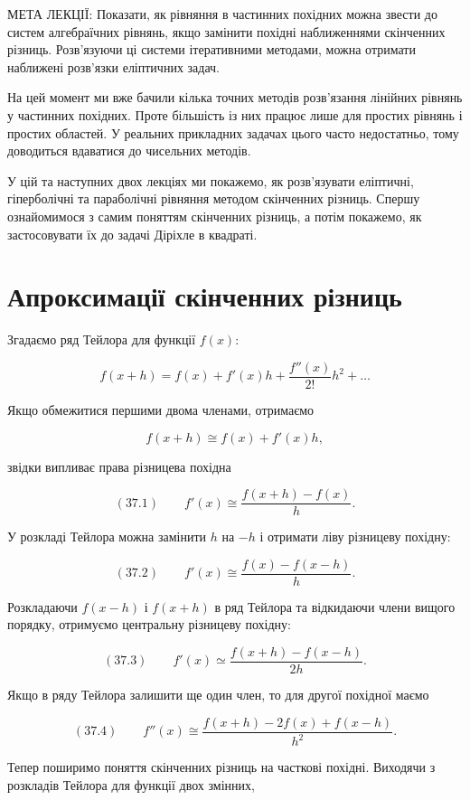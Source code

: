 \documentclass[
  ukrainian,
]{article}
\begin{document}
МЕТА ЛЕКЦІЇ: Показати, як рівняння в частинних похідних можна звести до
систем алгебраїчних рівнянь, якщо замінити похідні наближеннями
скінченних різниць. Розв'язуючи ці системи ітеративними методами, можна
отримати наближені розв'язки еліптичних задач.

На цей момент ми вже бачили кілька точних методів розв'язання лінійних
рівнянь у частинних похідних. Проте більшість із них працює лише для
простих рівнянь і простих областей. У реальних прикладних задачах цього
часто недостатньо, тому доводиться вдаватися до чисельних методів.

У цій та наступних двох лекціях ми покажемо, як розв'язувати еліптичні,
гіперболічні та параболічні рівняння методом скінченних різниць. Спершу
ознайомимося з самим поняттям скінченних різниць, а потім покажемо, як
застосовувати їх до задачі Діріхле в квадраті.

\section{Апроксимації скінченних
різниць}\label{ux430ux43fux440ux43eux43aux441ux438ux43cux430ux446ux456ux457-ux441ux43aux456ux43dux447ux435ux43dux43dux438ux445-ux440ux456ux437ux43dux438ux446ux44c}

Згадаємо ряд Тейлора для функції \(f(x)\):

\[
f(x+h)=f(x)+f'(x)h+\frac{f''(x)}{2!}h^2+\dots
\]

Якщо обмежитися першими двома членами, отримаємо

\[
f(x+h)\cong f(x)+f'(x)h,
\]

звідки випливає права різницева похідна

\[
(37.1)\qquad f'(x)\cong \frac{f(x+h)-f(x)}{h}.
\]

У розкладі Тейлора можна замінити \(h\) на \(-h\) і отримати ліву
різницеву похідну:

\[
(37.2)\qquad f'(x)\cong \frac{f(x)-f(x-h)}{h}.
\]

Розкладаючи \(f(x-h)\) і \(f(x+h)\) в ряд Тейлора та відкидаючи члени
вищого порядку, отримуємо центральну різницеву похідну:

\[
(37.3)\qquad f'(x)\simeq \frac{f(x+h)-f(x-h)}{2h}.
\]

Якщо в ряду Тейлора залишити ще один член, то для другої похідної маємо

\[
(37.4)\qquad f''(x)\cong \frac{f(x+h)-2f(x)+f(x-h)}{h^2}.
\]

Тепер поширимо поняття скінченних різниць на часткові похідні. Виходячи
з розкладів Тейлора для функції двох змінних,
\end{document}
